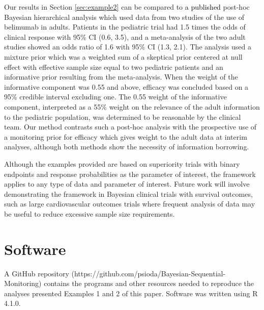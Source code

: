 \documentclass[12pt]{article}
\begin{document}
Our results in Section \ref{sec:example2} can be compared to \textcolor{black}{a published} post-hoc Bayesian hierarchical analysis \citep{Brunner2020} which used data from two studies of the use of belimumab in adults. Patients in the pediatric trial had 1.5 times the odds of clinical response with 95\% CI (0.6, 3.5), and a meta-analysis of the two adult studies showed an odds ratio of 1.6 with 95\% CI (1.3, 2.1). The analysis used a mixture prior which was a weighted sum of a skeptical prior centered at null effect with effective sample size equal to two pediatric patients and an informative prior resulting from the meta-analysis. When the weight of the informative component was 0.55 and above, efficacy was concluded based on a 95\% credible interval excluding one. The 0.55 weight of the informative component, interpreted as a 55\% weight on the relevance of the adult information to the pediatric population, was determined to be reasonable by the clinical team. Our method contrasts such a post-hoc analysis with the prospective use of a monitoring prior for efficacy which gives weight to the adult data at interim analyses, although both methods show the necessity of information borrowing. %

Although the examples provided are based on superiority trials with binary endpoints and response probabilities as the parameter of interest, the framework applies to any type of data and parameter of interest.
%
Future work will involve demonstrating the framework in Bayesian clinical trials with survival outcomes, such as large cardiovascular outcomes trials where frequent analysis of data may be useful to reduce excessive sample size requirements.


\section*{Software} \label{s:Software}
A GitHub repository (https://github.com/psioda/Bayesian-Sequential-Monitoring) contains the programs and other resources 
needed to reproduce the analyses presented Examples 1 and 2 of this paper. Software was written using R 4.1.0.
\end{document}
